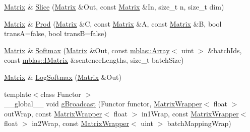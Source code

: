 \begin{DoxyCompactItemize}
\item 
\hyperlink{namespaceamunmt_1_1GPU_1_1mblas_ab67821a8254de53e45a623cf73c0aef6}{Matrix} \& \hyperlink{namespaceamunmt_1_1GPU_1_1mblas_aacbc57fa7bf5c1fac6abbd44a9832c8d}{Slice} (\hyperlink{namespaceamunmt_1_1GPU_1_1mblas_ab67821a8254de53e45a623cf73c0aef6}{Matrix} \&Out, const \hyperlink{namespaceamunmt_1_1GPU_1_1mblas_ab67821a8254de53e45a623cf73c0aef6}{Matrix} \&In, size\+\_\+t n, size\+\_\+t dim)
\item 
\hyperlink{namespaceamunmt_1_1GPU_1_1mblas_ab67821a8254de53e45a623cf73c0aef6}{Matrix} \& \hyperlink{namespaceamunmt_1_1GPU_1_1mblas_a463b2de180e8ab66bae53d1f8c5bc011}{Prod} (\hyperlink{namespaceamunmt_1_1GPU_1_1mblas_ab67821a8254de53e45a623cf73c0aef6}{Matrix} \&C, const \hyperlink{namespaceamunmt_1_1GPU_1_1mblas_ab67821a8254de53e45a623cf73c0aef6}{Matrix} \&A, const \hyperlink{namespaceamunmt_1_1GPU_1_1mblas_ab67821a8254de53e45a623cf73c0aef6}{Matrix} \&B, bool transA=false, bool transB=false)
\item 
\hyperlink{namespaceamunmt_1_1GPU_1_1mblas_ab67821a8254de53e45a623cf73c0aef6}{Matrix} \& \hyperlink{namespaceamunmt_1_1GPU_1_1mblas_ad21070cb29f8c33c03f76e31ef902dfe}{Softmax} (\hyperlink{namespaceamunmt_1_1GPU_1_1mblas_ab67821a8254de53e45a623cf73c0aef6}{Matrix} \&Out, const \hyperlink{classamunmt_1_1GPU_1_1mblas_1_1Array}{mblas\+::\+Array}$<$ uint $>$ \&batch\+Ids, const \hyperlink{namespaceamunmt_1_1GPU_1_1mblas_ad6a337d269d1833a6028b8871e57d2d0}{mblas\+::\+I\+Matrix} \&sentence\+Lengths, size\+\_\+t batch\+Size)
\item 
\hyperlink{namespaceamunmt_1_1GPU_1_1mblas_ab67821a8254de53e45a623cf73c0aef6}{Matrix} \& \hyperlink{namespaceamunmt_1_1GPU_1_1mblas_a25593e31e47b2518b1fc922e3b0a1a77}{Log\+Softmax} (\hyperlink{namespaceamunmt_1_1GPU_1_1mblas_ab67821a8254de53e45a623cf73c0aef6}{Matrix} \&Out)
\item 
{\footnotesize template$<$class Functor $>$ }\\\+\_\+\+\_\+global\+\_\+\+\_\+ void \hyperlink{namespaceamunmt_1_1GPU_1_1mblas_a60fe9588f1af65f7b3f39b69aadebe9c}{g\+Broadcast} (Functor functor, \hyperlink{classamunmt_1_1GPU_1_1mblas_1_1MatrixWrapper}{Matrix\+Wrapper}$<$ float $>$ out\+Wrap, const \hyperlink{classamunmt_1_1GPU_1_1mblas_1_1MatrixWrapper}{Matrix\+Wrapper}$<$ float $>$ in1\+Wrap, const \hyperlink{classamunmt_1_1GPU_1_1mblas_1_1MatrixWrapper}{Matrix\+Wrapper}$<$ float $>$ in2\+Wrap, const \hyperlink{classamunmt_1_1GPU_1_1mblas_1_1MatrixWrapper}{Matrix\+Wrapper}$<$ uint $>$ batch\+Mapping\+Wrap)
\item 

\end{DoxyCompactItemize}
